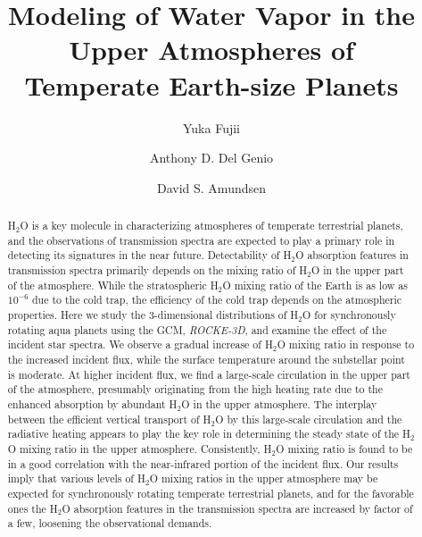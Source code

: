 \documentclass[11pt,numberedappendix,twocolappendix,]{emulateapj}
\def\water{H$_2$O }
\def\modelE{{\it ROCKE-3D}}
\begin{document}
\title{Modeling of Water Vapor in the Upper Atmospheres of 
\\Temperate Earth-size Planets}
\author{Yuka Fujii}
\author{Anthony D. Del Genio}
\author{David S. Amundsen}

\begin{abstract}

\water is a key molecule in characterizing atmospheres of temperate terrestrial planets, and the observations of transmission spectra are expected to play a primary role in detecting its signatures in the near future. 
%
Detectability of \water absorption features in transmission spectra primarily depends on the mixing ratio of \water in the upper part of the atmosphere. 
%
While the stratospheric \water mixing ratio of the Earth is as low as $10^{-6}$ due to the cold trap, the efficiency of the cold trap depends on the atmospheric properties. 
%
Here we study the 3-dimensional distributions of \water for synchronously rotating aqua planets using the GCM, \modelE, and examine the effect of the incident star spectra. 
%
We observe a gradual increase of \water mixing ratio in response to the increased incident flux, while the surface temperature around the substellar point is moderate. 
%
At higher incident flux, we find a large-scale circulation in the upper part of the atmosphere, presumably originating from the high heating rate due to the enhanced absorption by abundant \water in the upper atmosphere. 
%
The interplay between the efficient vertical transport of \water by this large-scale circulation and the radiative heating appears to play the key role in determining the steady state of the \water mixing ratio in the upper atmosphere.  
%
Consistently, \water mixing ratio is found to be in a good correlation with the near-infrared portion of the incident flux. 
%
Our results imply that various levels of \water mixing ratios in the upper atmosphere may be expected for synchronously rotating temperate terrestrial planets, and for the favorable ones the \water absorption features in the transmission spectra are increased by factor of a few, loosening the observational demands. 
%
\end{abstract}
\end{document}
